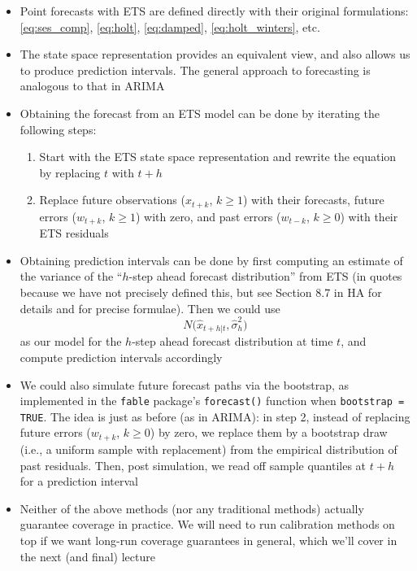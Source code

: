\documentclass{article}
\begin{document}
\begin{itemize}
\item Point forecasts with ETS are defined directly with their original
  formulations: \eqref{eq:ses_comp}, \eqref{eq:holt}, \eqref{eq:damped}, 
  \eqref{eq:holt_winters}, etc.

\item The state space representation provides an equivalent view, and also
  allows us to produce prediction intervals. The general approach to forecasting
  is analogous to that in ARIMA

\item Obtaining the forecast  from an ETS model can
  be done by iterating the following steps:  

\begin{enumerate}
\item Start with the ETS state space representation and rewrite the equation by
  replacing $t$ with $t+h$

\item Replace future observations ($x_{t+k}$, $k \geq 1$) with their forecasts,
  future errors ($w_{t+k}$, $k \geq 1$) with zero, and past errors ($w_{t-k}$,
  $k \geq 0$) with their ETS residuals   
\end{enumerate}

\item Obtaining prediction intervals can be done by first computing an estimate
   of the variance of the ``$h$-step ahead forecast
  distribution'' from ETS (in quotes because we have not precisely defined this,
  but see Section 8.7 in HA for details and for precise formulae). Then we could
  use  
  \[
  N\big( \hat{x}_{t+h | t}, \hat\sigma^2_h \big)
  \]
  as our model for the $h$-step ahead forecast distribution at time $t$, and
  compute prediction intervals accordingly

\item We could also simulate future forecast paths via the bootstrap, as
  implemented in the \verb|fable| package's \verb|forecast()| function when 
  \verb|bootstrap = TRUE|. The idea is just as before (as in ARIMA): in step 2,
  instead of replacing future errors ($w_{t+k}$, $k \geq 0$) by zero, we replace
  them by a bootstrap draw (i.e., a uniform sample with replacement) from the
  empirical distribution of past residuals. Then, post simulation, we read off
  sample quantiles at $t+h$ for a prediction interval     

\item Neither of the above methods (nor any traditional methods) actually
  guarantee coverage in practice. We will need to run calibration methods on
  top if we want long-run coverage guarantees in general, which we'll cover in
  the next (and final) lecture 
\end{itemize}
\end{document}

